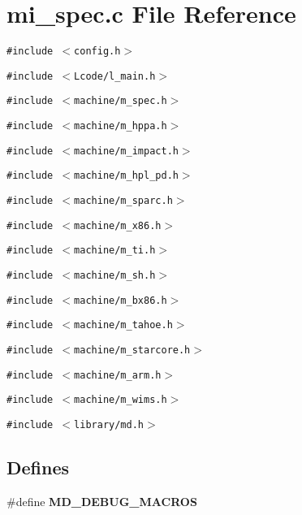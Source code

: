 \section{mi\_\-spec.c File Reference}
\label{mi__spec_8c}
{\tt \#include $<$config.h$>$}\par
{\tt \#include $<$Lcode/l\_\-main.h$>$}\par
{\tt \#include $<$machine/m\_\-spec.h$>$}\par
{\tt \#include $<$machine/m\_\-hppa.h$>$}\par
{\tt \#include $<$machine/m\_\-impact.h$>$}\par
{\tt \#include $<$machine/m\_\-hpl\_\-pd.h$>$}\par
{\tt \#include $<$machine/m\_\-sparc.h$>$}\par
{\tt \#include $<$machine/m\_\-x86.h$>$}\par
{\tt \#include $<$machine/m\_\-ti.h$>$}\par
{\tt \#include $<$machine/m\_\-sh.h$>$}\par
{\tt \#include $<$machine/m\_\-bx86.h$>$}\par
{\tt \#include $<$machine/m\_\-tahoe.h$>$}\par
{\tt \#include $<$machine/m\_\-starcore.h$>$}\par
{\tt \#include $<$machine/m\_\-arm.h$>$}\par
{\tt \#include $<$machine/m\_\-wims.h$>$}\par
{\tt \#include $<$library/md.h$>$}\par
\subsection*{Defines}
\begin{CompactItemize}
\item 
\#define \bf{MD\_\-DEBUG\_\-MACROS}
\end{CompactItemize}
